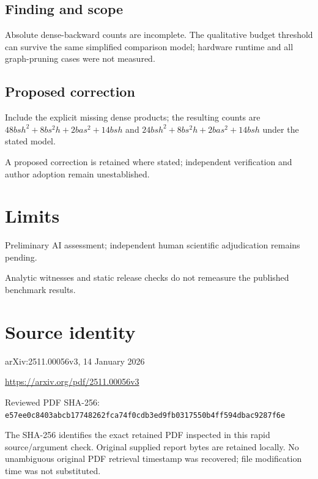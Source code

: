 \documentclass[11pt]{article}
\begin{document}
\subsection*{Finding and scope}

Absolute dense-backward counts are incomplete. The qualitative budget threshold can survive the same simplified comparison model; hardware runtime and all graph-pruning cases were not measured.

\subsection*{Proposed correction}

Include the explicit missing dense products; the resulting counts are \(48bsh^2+8bs^2h+2bas^2+14bsh\) and \(24bsh^2+8bs^2h+2bas^2+14bsh\) under the stated model.

A proposed correction is retained where stated; independent verification and author adoption remain unestablished.

\section*{Limits}

Preliminary AI assessment; independent human scientific adjudication remains pending.\par

Analytic witnesses and static release checks do not remeasure the published benchmark results.\par

\section*{Source identity}

arXiv:2511.00056v3, 14 January 2026

\url{https://arxiv.org/pdf/2511.00056v3}

Reviewed PDF SHA-256: \nolinkurl{e57ee0c8403abcb17748262fca74f0cdb3ed9fb0317550b4ff594dbac9287f6e}

The SHA-256 identifies the exact retained PDF inspected in this rapid source/argument check. Original supplied report bytes are retained locally. No unambiguous original PDF retrieval timestamp was recovered; file modification time was not substituted.
\end{document}
